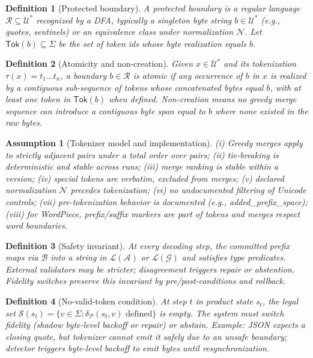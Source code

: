 \documentclass{article}
\newtheorem{assumption}{Assumption}
\newtheorem{definition}{Definition}
\begin{document}
\begin{definition}[Protected boundary]
A protected boundary is a regular language $\mathcal{R}\subseteq\mathcal{U}^\ast$ recognized by a DFA, typically a singleton byte string $b\in\mathcal{U}^\ast$ (e.g., quotes, sentinels) or an equivalence class under normalization $\mathcal{N}$. Let $\mathsf{Tok}(b)\subseteq\Sigma$ be the set of token ids whose byte realization equals $b$.
\end{definition}

\begin{definition}[Atomicity and non-creation]
Given $x\in\mathcal{U}^\ast$ and its tokenization $\tau(x)=t_1\dots t_n$, a boundary $b\in\mathcal{R}$ is atomic if any occurrence of $b$ in $x$ is realized by a contiguous sub-sequence of tokens whose concatenated bytes equal $b$, with at least one token in $\mathsf{Tok}(b)$ when defined. Non-creation means no greedy merge sequence can introduce a contiguous byte span equal to $b$ where none existed in the raw bytes.
\end{definition}

\begin{assumption}[Tokenizer model and implementation]\label{assump:tok}
(i) Greedy merges apply to strictly adjacent pairs under a total order over pairs; (ii) tie-breaking is deterministic and stable across runs; (iii) merge ranking is stable within a version; (iv) special tokens are verbatim, excluded from merges; (v) declared normalization $\mathcal{N}$ precedes tokenization; (vi) no undocumented filtering of Unicode controls; (vii) pre-tokenization behavior is documented (e.g., added\_prefix\_space); (viii) for WordPiece, prefix/suffix markers are part of tokens and merges respect word boundaries.
\end{assumption}

\begin{definition}[Safety invariant]
At every decoding step, the committed prefix maps via $\mathcal{B}$ into a string in $\mathcal{L}(\mathcal{A})$ or $\mathcal{L}(\mathcal{G})$ and satisfies type predicates. External validators may be stricter; disagreement triggers repair or abstention. Fidelity switches preserve this invariant by pre/post-conditions and rollback.
\end{definition}

\begin{definition}[No-valid-token condition]
At step $t$ in product state $s_t$, the legal set $\mathcal{S}(s_t)=\{v\in\Sigma:\delta_{\mathcal{P}}(s_t,v)\text{ defined}\}$ is empty. The system must switch fidelity (shadow byte-level backoff or repair) or abstain. Example: JSON expects a closing quote, but tokenizer cannot emit it safely due to an unsafe boundary; detector triggers byte-level backoff to emit bytes until resynchronization.
\end{definition}
\end{document}
